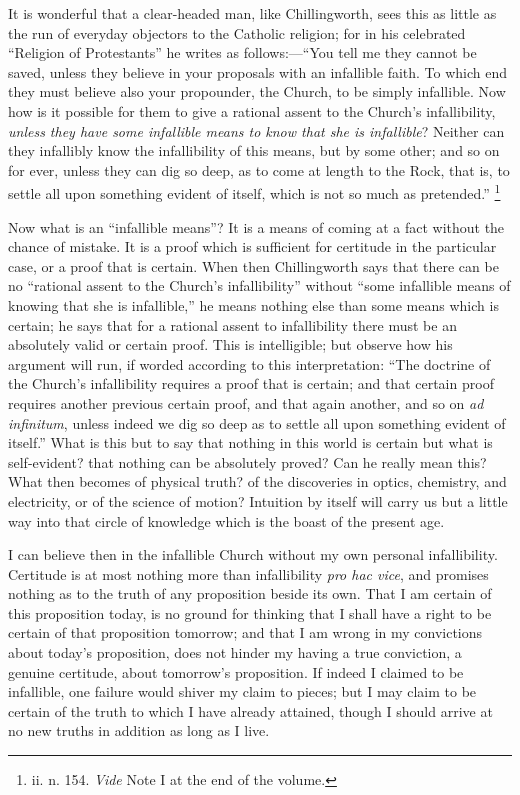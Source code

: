 It is wonderful that a clear-headed man, like Chillingworth, sees
this as little as the run of everyday objectors to the Catholic
religion; for in his celebrated ``Religion of Protestants'' he
writes as follows:—``You tell me they cannot be saved, unless
they believe in your proposals with an infallible faith. To which end
they must believe also your propounder, the Church, to be simply
infallible. Now how is it possible for them to give a rational assent
to the Church's infallibility, \emph{unless they have some infallible
means to know that she is infallible}? Neither can they infallibly
know the infallibility of this means, but by some other; and so on for
ever, unless they can dig so deep, as to come at length to the Rock,
that is, to settle all upon something evident of itself, which is not
so much as pretended.'' \footnote{ii. n. 154. \emph{Vide} Note I at the end of the volume.}

Now what is an ``infallible means''? It is a means of
coming at a fact without the chance of mistake. It is a proof which is
sufficient for certitude in the particular case, or a proof that is
certain. When then Chillingworth says that there can be no
``rational assent to the Church's infallibility'' without
``some infallible means of knowing that she is infallible,''
he means nothing else than some means which is certain; he says
that for a rational assent to infallibility there must be an
absolutely valid or certain proof. This is intelligible; but observe
how his argument will run, if worded according to this interpretation:
``The doctrine of the Church's infallibility requires a proof that
is certain; and that certain proof requires another previous certain
proof, and that again another, and so on \emph{ad infinitum}, unless
indeed we dig so deep as to settle all upon something evident of
itself.'' What is this but to say that nothing in this world is
certain but what is self-evident? that nothing can be absolutely
proved? Can he really mean this? What then becomes of physical truth?
of the discoveries in optics, chemistry, and electricity, or of the
science of motion? Intuition by itself will carry us but a little way
into that circle of knowledge which is the boast of the present age.

I can believe then in the infallible Church without my own personal
infallibility. Certitude is at most nothing more than infallibility \emph{pro
hac vice}, and promises nothing as to the truth of any proposition
beside its own. That I am certain of this proposition today, is no
ground for thinking that I shall have a right to be certain of that
proposition tomorrow; and that I am wrong in my convictions about
today's proposition, does not hinder my having a true conviction, a
genuine certitude, about tomorrow's proposition. If indeed I claimed
to be infallible, one failure would shiver my claim to pieces; but I
may claim to be certain of the truth to which I have already attained,
though I should arrive at no new truths in addition as long as I live.

